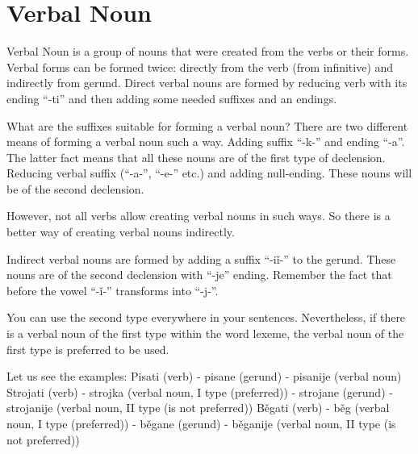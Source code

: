 \section{Verbal Noun}

Verbal Noun is a group of nouns that were created from the verbs or their forms. Verbal forms can be formed twice: directly from the verb (from infinitive) and indirectly from gerund.
Direct verbal nouns are formed by reducing verb with its ending “-ti” and then adding some needed suffixes and an endings.

What are the suffixes suitable for forming a verbal noun? 
There are two different means of forming a verbal noun such a way.
Adding suffix “-k-” and ending “-a”. The latter fact means that all these nouns are of the first type of declension. 
Reducing verbal suffix (“-a-”,  “-e-” etc.) and adding null-ending. These nouns will be of the second declension.

However, not all verbs allow creating verbal nouns in such ways. So there is a better way of creating verbal nouns indirectly.

Indirect verbal nouns are formed by adding a suffix “-iǐ-” to the gerund. These nouns are of the second declension with “-je” ending. Remember the fact that before the vowel “-ǐ-” transforms into “-j-”. 

You can use the second type everywhere in your sentences. Nevertheless, if there is a verbal noun of the first type within the word lexeme, the verbal noun of the first type is preferred to be used.

Let us see the examples:
Pisati (verb) - pisane (gerund) - pisanije (verbal noun)
Strojati (verb) - strojka (verbal noun, I type (preferred)) - strojane (gerund) - strojanije (verbal noun, II type (is not preferred))
Běgati (verb) - běg (verbal noun, I type (preferred)) - běgane (gerund) - běganije (verbal noun, II type (is not preferred))  

